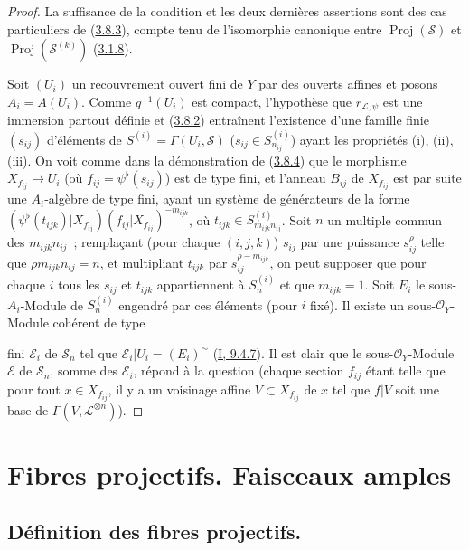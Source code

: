 \begin{proof}
La suffisance de la condition et les deux dernières assertions sont des cas
particuliers de (\hyperref[II.3.8.3-fr]{3.8.3}), compte tenu de l'isomorphie
canonique entre $\operatorname{Proj}(\mathcal{S})$ et
$\operatorname{Proj}(\mathcal{S}^{(k)})$
(\hyperref[II.3.1.8-fr]{3.1.8}).

Soit $(U_i)$ un recouvrement ouvert fini de $Y$ par des ouverts affines et
posons $A_i=A(U_i)$. Comme $q^{-1}(U_i)$ est compact, l'hypothèse que
$r_{\mathcal{L},\psi}$ est une immersion partout définie et
(\hyperref[II.3.8.2-fr]{3.8.2}) entraînent l'existence d'une famille finie
$(s_{ij})$ d'éléments de
$S^{(i)}=\Gamma(U_i,\mathcal{S})$ ($s_{ij}\in S_{n_{ij}}^{(i)}$) ayant les
propriétés (i), (ii), (iii). On voit comme dans la démonstration de
(\hyperref[II.3.8.4-fr]{3.8.4}) que le morphisme $X_{f_{ij}}\to U_i$ (où
$f_{ij}=\psi^\flat(s_{ij})$) est de type fini, et l'anneau $B_{ij}$ de
$X_{f_{ij}}$ est par suite une $A_i$-algèbre de type fini, ayant un système de
générateurs de la forme
$(\psi^\flat(t_{ijk})|X_{f_{ij}})(f_{ij}|X_{f_{ij}})^{-m_{ijk}}$, où
$t_{ijk}\in S_{m_{ijk}n_{ij}}^{(i)}$. Soit $n$ un multiple commun des
$m_{ijk}n_{ij}$~; remplaçant (pour chaque $(i,j,k)$) $s_{ij}$ par une
puissance $s_{ij}^\rho$ telle que $\rho m_{ijk}n_{ij}=n$, et multipliant
$t_{ijk}$ par $s_{ij}^{\rho-m_{ijk}}$, on peut supposer que pour chaque $i$
tous les $s_{ij}$ et $t_{ijk}$ appartiennent à $S_n^{(i)}$ et que
$m_{ijk}=1$. Soit $E_i$ le sous-$A_i$-Module de $S_n^{(i)}$ engendré par ces
éléments (pour $i$ fixé). Il existe un sous-$\mathcal{O}_Y$-Module cohérent de
type


fini $\mathcal{E}_i$ de $\mathcal{S}_n$ tel que
$\mathcal{E}_i|U_i=(E_i)^{\sim}$
(\hyperref[I.9.4.7-fr]{I, 9.4.7}). Il est clair que le
sous-$\mathcal{O}_Y$-Module $\mathcal{E}$ de $\mathcal{S}_n$, somme des
$\mathcal{E}_i$, répond à la question (chaque section $f_{ij}$ étant telle
que pour tout $x\in X_{f_{ij}}$, il y a un voisinage affine
$V\subset X_{f_{ij}}$ de $x$ tel que $f|V$ soit une base de
$\Gamma(V,\mathcal{L}^{\otimes n})$).
\end{proof}

\section{Fibres projectifs. Faisceaux amples}
\label{section:II.4-fr}

\subsection{Définition des fibres projectifs.}
\label{subsection:II.4.1-fr}


